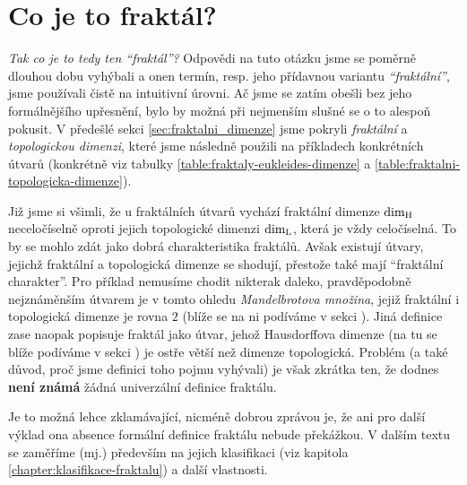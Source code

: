 \section{Co je to fraktál?}\label{sec:co-je-to-fraktal}
\emph{Tak co je to tedy ten ``fraktál''?} Odpovědi na tuto otázku jsme se poměrně dlouhou dobu vyhýbali a onen termín, resp. jeho přídavnou variantu \emph{``fraktální''}, jsme používali čistě na intuitivní úrovni. Ač jsme se zatím obešli bez jeho formálnějšího upřesnění, bylo by možná při nejmenším slušné se o to alespoň pokusit. V předešlé sekci \ref{sec:fraktalni_dimenze} jsme pokryli \emph{fraktální} a \emph{topologickou dimenzi}, které jsme následně použili na příkladech konkrétních útvarů (konkrétně viz tabulky \ref{table:fraktaly-eukleides-dimenze} a \ref{table:fraktalni-topologicka-dimenze}).

Již jsme si všimli, že u fraktálních útvarů vychází fraktální dimenze $\operatorname{dim_H}$ neceločíselně oproti jejich topologické dimenzi $\operatorname{dim_L}$, která je vždy celočíselná. To by se mohlo zdát jako dobrá charakteristika fraktálů. Avšak existují útvary, jejichž fraktální a topologická dimenze se shodují, přestože také mají ``fraktální charakter''. Pro příklad nemusíme chodit nikterak daleko, pravděpodobně nejznáměnším útvarem je v tomto ohledu \emph{Mandelbrotova množina}, jejiž fraktální i topologická dimenze je rovna $2$ (blíže se na ni podíváme v sekci ). Jiná definice zase naopak popisuje fraktál jako útvar, jehož Hausdorffova dimenze (na tu se blíže podíváme v sekci ) je ostře větší než dimenze topologická. Problém (a také důvod, proč jsme definici toho pojmu vyhývali) je však zkrátka ten, že dodnes \textbf{není známá} žádná univerzální definice fraktálu. \cite[str. 226]{Voracova2022}

Je to možná lehce zklamávající, nicméně dobrou zprávou je, že ani pro další výklad ona absence formální definice fraktálu nebude překážkou. V dalším textu se zaměříme (mj.) především na jejich klasifikaci (viz kapitola \ref{chapter:klasifikace-fraktalu}) a další vlastnosti.